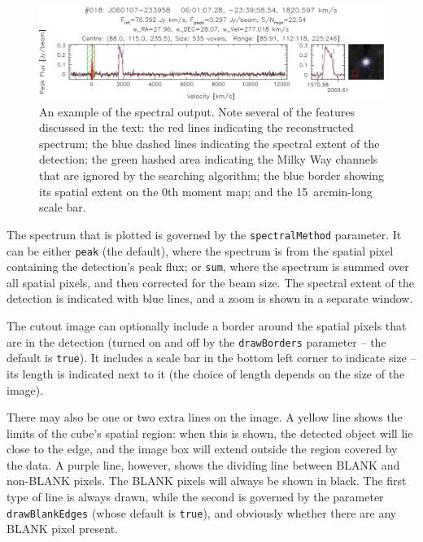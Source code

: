 \begin{figure}[t]
\begin{center}
\includegraphics[width=\textwidth]{example_spectrum}
\end{center}
\caption{\footnotesize An example of the spectral output. Note several
  of the features discussed in the text: the red lines indicating the
  reconstructed spectrum; the blue dashed lines indicating the
  spectral extent of the detection; the green hashed area indicating
  the Milky Way channels that are ignored by the searching algorithm;
  the blue border showing its spatial extent on the 0th moment map;
  and the 15~arcmin-long scale bar.}
\label{fig-spect}
\end{figure}

The spectrum that is plotted is governed by the
\texttt{spectralMethod} parameter. It can be either \texttt{peak} (the
default), where the spectrum is from the spatial pixel containing the
detection's peak flux; or \texttt{sum}, where the spectrum is summed
over all spatial pixels, and then corrected for the beam size.  The
spectral extent of the detection is indicated with blue lines, and a
zoom is shown in a separate window.

The cutout image can optionally include a border around the spatial
pixels that are in the detection (turned on and off by the
\texttt{drawBorders} parameter -- the default is \texttt{true}). It
includes a scale bar in the bottom left corner to indicate size -- its
length is indicated next to it (the choice of length depends on the
size of the image).

There may also be one or two extra lines on the image. A yellow line
shows the limits of the cube's spatial region: when this is shown, the
detected object will lie close to the edge, and the image box will
extend outside the region covered by the data. A purple line, however,
shows the dividing line between BLANK and non-BLANK pixels. The BLANK
pixels will always be shown in black. The first type of line is always
drawn, while the second is governed by the parameter
\texttt{drawBlankEdges} (whose default is \texttt{true}), and
obviously whether there are any BLANK pixel present.

